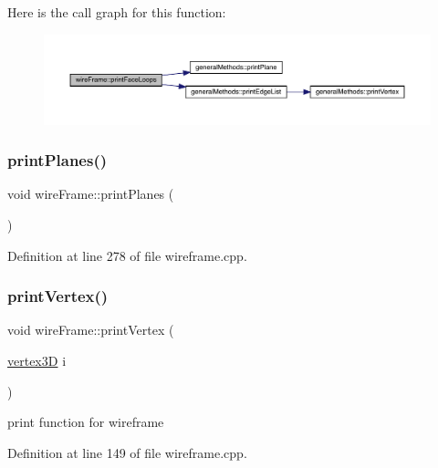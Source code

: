 Here is the call graph for this function\+:
\nopagebreak
\begin{figure}[H]
\begin{center}
\leavevmode
\includegraphics[width=350pt]{classwire_frame_a7c89bdfbf8e94eb33f90d6057f785cd9_cgraph}
\end{center}
\end{figure}
\mbox{\label{classwire_frame_a1241bc0d6c1edf1d3ddb5fa8440b8bcb}} 
\subsubsection{\texorpdfstring{print\+Planes()}{printPlanes()}}
{\footnotesize\ttfamily void wire\+Frame\+::print\+Planes (\begin{DoxyParamCaption}{ }\end{DoxyParamCaption})}



Definition at line 278 of file wireframe.\+cpp.

\mbox{\label{classwire_frame_a34148f5947e3d44f74650bb88c532905}} 
\subsubsection{\texorpdfstring{print\+Vertex()}{printVertex()}}
{\footnotesize\ttfamily void wire\+Frame\+::print\+Vertex (\begin{DoxyParamCaption}\item[{\mbox{\hyperlink{structvertex3_d}{vertex3D}}}]{i }\end{DoxyParamCaption})}



print function for wireframe 



Definition at line 149 of file wireframe.\+cpp.

\mbox{\label{classwire_frame_a1f30c3a4320bb7016abedab3a1cf18d5}} 
